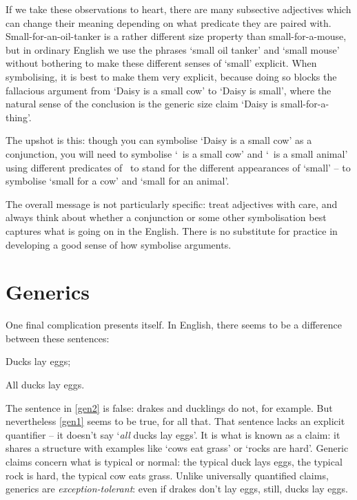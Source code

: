 If we take these observations to heart, there are many subsective adjectives which can change their meaning depending on what predicate they are paired with. Small-for-an-oil-tanker is a rather different size property than small-for-a-mouse, but in ordinary English we use the phrases `small oil tanker' and `small mouse' without bothering to make these different senses of `small' explicit. When symbolising, it is best to make them very explicit, because doing so blocks the fallacious argument from `Daisy is a small cow' to `Daisy is small', where the natural sense of the conclusion is the generic size claim `Daisy is small-for-a-thing'. 

The upshot is this: though you can symbolise `Daisy is a small cow' as a conjunction, you will need to symbolise `\blank\ is a small cow' and `\blank\ is a small animal' using different predicates of \FOL\ to stand for the different appearances of `small' – to symbolise `small for a cow' and `small for an animal'. 

The overall message is not particularly specific: treat adjectives with care, and always think about whether a conjunction or some other symbolisation best captures what is going on in the English. There is no substitute for practice in developing a good sense of how symbolise arguments. 

\section{Generics} %
\label{sec:generics}
One final complication presents itself. In English, there seems to be a difference between these sentences: \begin{earg}
	\item[\ex{gen1}] Ducks lay eggs;
	\item[\ex{gen2}] All ducks lay eggs.
\end{earg}
The sentence in \ref{gen2} is false: drakes and ducklings do not, for example. But nevertheless \ref{gen1} seems to be true, for all that. That sentence lacks an explicit quantifier – it doesn't say `\emph{all} ducks lay eggs'. It is what is known as a  claim: it shares a structure with examples like `cows eat grass' or `rocks are hard'. Generic claims concern what is typical or normal: the typical duck lays eggs, the typical rock is hard, the typical cow eats grass. Unlike universally quantified claims, generics are \emph{exception-tolerant}: even if drakes don't lay eggs, still, ducks lay eggs.

